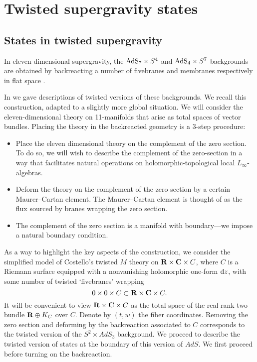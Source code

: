 %
%
%

\section{Twisted supergravity states}

\subsection{States in twisted supergravity}

In eleven-dimensional supergravity, the ${\rm AdS}_7 \times S^4$ and ${\rm AdS}_{4}\times S^{7}$ backgrounds are obtained by backreacting a number of fivebranes and membranes respectively in flat space .

In \cite{RSW} we gave descriptions of twisted versions of these backgrounds. We recall this construction, adapted to a slightly more global situation. We will consider the eleven-dimensional theory on 11-manifolds that arise as total spaces of vector bundles. Placing the theory in the backreacted geometry is a 3-step procedure:

\begin{itemize}
  \item Place the eleven dimensional theory on the complement of the zero section. To do so, we will wish to describe the complement of the zero-section in a way that facilitates natural operations on holomorphic-topological local $L_{\infty}$-algebras.

  \item Deform the theory on the complement of the zero section by a certain Maurer--Cartan element.
  The Maurer--Cartan element is thought of as the flux sourced by branes wrapping the zero section.

  \item The complement of the zero section is a manifold with boundary---we impose a natural boundary condition.

\end{itemize}

\parsec[s:brkevin]

As a way to highlight the key aspects of the construction, we consider the simplified model of Costello's twisted $M$ theory on $\mathbf{R} \times \mathbf{C} \times C$, where $C$ is a Riemann surface equipped with a nonvanishing holomorphic one-form ${\rm d} z$, with some number of twisted `fivebranes' wrapping
\[
0 \times 0 \times C \subset \mathbf{R} \times \mathbf{C} \times C .
\]
It will be convenient to view $\mathbf{R} \times \mathbf{C} \times C$ as the total space of the real rank two bundle $\mathbf{R} \oplus K_C$ over $C$.
Denote by $(t,w)$ the fiber coordinates.
Removing the zero section and deforming by the backreaction associated to $C$ corresponds to the twisted version of the $S^2 \times AdS_3$ background.
We proceed to describe the twisted version of states at the boundary of this version of $AdS$.
We first proceed before turning on the backreaction.

